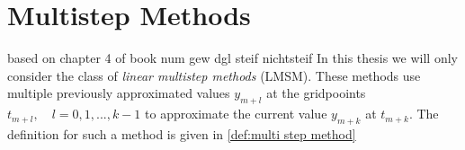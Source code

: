 	
		
	
	
		
	
			
\section{Multistep Methods}
	based on chapter 4 of book num gew dgl steif nichtsteif \newline
	In this thesis we will only consider the class of \emph{linear multistep methods} (LMSM). These methods use multiple previously approximated values $y_{m+l}$ at the gridpooints  $t_{m+l}, \quad l=0,1,...,k-1$ to approximate the current value $y_{m+k}$ at $t_{m+k}$. The definition for such a method is given in \ref{def:multi step method}
	
